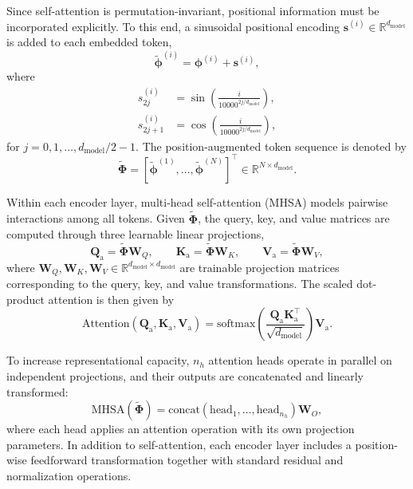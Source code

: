 \documentclass[journal]{IEEEtran}
\newcommand{\vs}{\mathbf{s}}
\newcommand{\vphi}{\boldsymbol{\phi}}
\newcommand{\mW}{\mathbf{W}}
\newcommand{\mPhi}{\boldsymbol{\Phi}}
\newcommand{\mQa}{\mathbf{Q}_{\mathrm{a}}}
\newcommand{\mKa}{\mathbf{K}_{\mathrm{a}}}
\newcommand{\mVa}{\mathbf{V}_{\mathrm{a}}}
\begin{document}
Since self-attention is permutation-invariant, positional information must be incorporated explicitly. To this end, a sinusoidal positional encoding $\vs^{(i)} \in \mathbb{R}^{d_{\mathrm{model}}}$ is added to each embedded token,
\begin{equation}
    \tilde{\vphi}^{(i)} = \vphi^{(i)} + \vs^{(i)},
\end{equation}
where
\begin{equation}
\begin{split}
    s^{(i)}_{2j} &= \sin\!\left(\frac{i}{10000^{2j/d_{\mathrm{model}}}}\right), \\
    s^{(i)}_{2j+1} &= \cos\!\left(\frac{i}{10000^{2j/d_{\mathrm{model}}}}\right),
\end{split}
\label{eq:pos_enc}
\end{equation}
for $j = 0,1,\ldots,d_{\mathrm{model}}/2-1$. The position-augmented token sequence is denoted by
\begin{equation}
    \widetilde{\mPhi}
    =
    [\tilde{\vphi}^{(1)}, \ldots, \tilde{\vphi}^{(N)}]^\top
    \in \mathbb{R}^{N \times d_{\mathrm{model}}}.
\end{equation}

Within each encoder layer, multi-head self-attention (MHSA) models pairwise interactions among all tokens. Given $\widetilde{\mPhi}$, the query, key, and value matrices are computed through three learnable linear projections,
\begin{equation}
    \mQa = \widetilde{\mPhi}\mW_Q, \qquad
    \mKa = \widetilde{\mPhi}\mW_K, \qquad
    \mVa = \widetilde{\mPhi}\mW_V,
    \label{eq:qkv}
\end{equation}
where $\mW_Q, \mW_K, \mW_V \in \mathbb{R}^{d_{\mathrm{model}} \times d_{\mathrm{model}}}$ are trainable projection matrices corresponding to the query, key, and value transformations. The scaled dot-product attention is then given by
\begin{equation}
    \mathrm{Attention}(\mQa,\mKa,\mVa)
    =
    \mathrm{softmax}\!\left(\frac{\mQa\mKa^\top}{\sqrt{d_{\mathrm{model}}}}\right)\mVa.
    \label{eq:attention}
\end{equation}

To increase representational capacity, $n_h$ attention heads operate in parallel on independent projections, and their outputs are concatenated and linearly transformed:
\begin{equation}
    \mathrm{MHSA}(\widetilde{\mPhi})
    =
    \mathrm{concat}(\mathrm{head}_1,\ldots,\mathrm{head}_{n_h})\mW_O,
    \label{eq:mhsa}
\end{equation}
where each head applies an attention operation with its own projection parameters. In addition to self-attention, each encoder layer includes a position-wise feedforward transformation together with standard residual and normalization operations.
\end{document}
